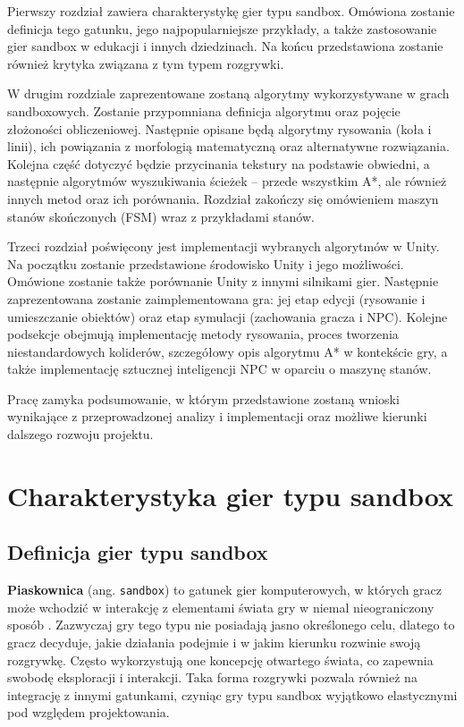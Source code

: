 \documentclass[a4paper,12pt]{book} %
\begin{document}
Pierwszy rozdział zawiera charakterystykę gier typu sandbox. Omówiona zostanie definicja tego gatunku, jego najpopularniejsze przykłady, a także zastosowanie gier sandbox w edukacji i innych dziedzinach. Na końcu przedstawiona zostanie również krytyka związana z tym typem rozgrywki.  

W drugim rozdziale zaprezentowane zostaną algorytmy wykorzystywane w grach sandboxowych. Zostanie przypomniana definicja algorytmu oraz pojęcie złożoności obliczeniowej. Następnie opisane będą algorytmy rysowania (koła i linii), ich powiązania z morfologią matematyczną oraz alternatywne rozwiązania. Kolejna część dotyczyć będzie przycinania tekstury na podstawie obwiedni, a następnie algorytmów wyszukiwania ścieżek – przede wszystkim A*, ale również innych metod oraz ich porównania. Rozdział zakończy się omówieniem maszyn stanów skończonych (FSM) wraz z przykładami stanów.  

Trzeci rozdział poświęcony jest implementacji wybranych algorytmów w Unity. Na początku zostanie przedstawione środowisko Unity i jego możliwości. Omówione zostanie także porównanie Unity z innymi silnikami gier. Następnie zaprezentowana zostanie zaimplementowana gra: jej etap edycji (rysowanie i umieszczanie obiektów) oraz etap symulacji (zachowania gracza i NPC). Kolejne podsekcje obejmują implementację metody rysowania, proces tworzenia niestandardowych koliderów, szczegółowy opis algorytmu A* w kontekście gry, a także implementację sztucznej inteligencji NPC w oparciu o maszynę stanów.  

Pracę zamyka podsumowanie, w którym przedstawione zostaną wnioski wynikające z przeprowadzonej analizy i implementacji oraz możliwe kierunki dalszego rozwoju projektu.  


\chapter{Charakterystyka gier typu sandbox}

\section{Definicja gier typu sandbox}

\textbf{Piaskownica} (ang. \texttt{sandbox}) to gatunek gier komputerowych, w których gracz może wchodzić w interakcję z elementami świata gry w niemal nieograniczony sposób \cite{Sandbox_definition}. Zazwyczaj gry tego typu nie posiadają jasno określonego celu, dlatego to gracz decyduje, jakie działania podejmie i w jakim kierunku rozwinie swoją rozgrywkę. Często wykorzystują one koncepcję otwartego świata, co zapewnia swobodę eksploracji i interakcji. Taka forma rozgrywki pozwala również na integrację z innymi gatunkami, czyniąc gry typu sandbox wyjątkowo elastycznymi pod względem projektowania.
\end{document}
